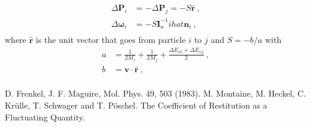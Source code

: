 \documentclass[aps,pre,onecolumn,preprint,showpacs]{revtex4}
\begin{document}
\begin{align}
  \Delta \mathbf{P}_i &= -  \Delta \mathbf{P}_j = - S\hat{\mathbf{r}}~,\\
  \Delta \mathbf{\omega}_i &=  - S\mathbf{I}^{-1}_aihat{\mathbf{n}}_i~,\\
\end{align}
where $\hat{\mathbf{r}}$ is the unit vector that goes from 
particle $i$ to $j$ and $S = - b/a$ with 
\begin{align}
  a &= \frac{1}{2M_i} + \frac{1}{2M_j} + \frac{\Delta E_{\omega i} + \Delta E_{\omega j}}{2}~,\\
  b &=  \mathbf{v}\cdot \hat{\mathbf{r}}~,\\
\end{align}

\begin{thebibliography}{}

  D. Frenkel, J. F. Maguire, Mol. Phys. 49, 503 (1983).
 M. Montaine, M. Heckel, C. Kr\"ulle, T. Schwager and T. P\"oschel. The
Coefficient of Restitution as a Fluctuating Quantity.

\end{thebibliography}
\end{document}
